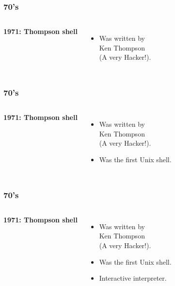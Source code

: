 \documentclass[aspectratio=169]{beamer}
\begin{document}
\begin{frame}
	\frametitle{ 70's}
	\begin{columns}[c]
			\textbf{1971: Thompson shell}
			\begin{itemize}
				\item Was written by\\
					Ken Thompson\\
					(A very Hacker!).
			\end{itemize}
			\begin{figure}[h!]
			\end{figure}		
	\end{columns}
\end{frame}

\begin{frame}
	\frametitle{ 70's}
	\begin{columns}[c]
			\textbf{1971: Thompson shell}
			\begin{itemize}
				\item Was written by\\
					Ken Thompson\\
					(A very Hacker!).
				\item Was the first Unix shell.
			\end{itemize}
			\begin{figure}[h!]
			\end{figure}		
	\end{columns}
\end{frame}

\begin{frame}
	\frametitle{ 70's}
	\begin{columns}[c]
			\textbf{1971: Thompson shell}
			\begin{itemize}
				\item Was written by\\
					Ken Thompson\\
					(A very Hacker!).
				\item Was the first Unix shell.
				\item Interactive interpreter.
			\end{itemize}
			\begin{figure}[h!]
			\end{figure}		
	\end{columns}
\end{frame}
\end{document}
